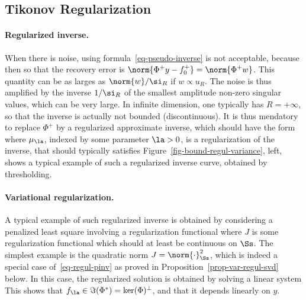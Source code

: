 

\subsection{Tikonov Regularization}

\paragraph{Regularized inverse.}

When there is noise, using formula~\eqref{eq-pseudo-inverse} is not acceptable, because then 
so that the recovery error is $\norm{\Phi^+ y -f_0^+} = \norm{\Phi^+ w}$. This quantity can be as larges as $\norm{w}/\si_R$ if $w \propto u_R$. The noise is thus amplified by the inverse $1/\si_R$ of the smallest amplitude non-zero singular values, which can be very large. In infinite dimension, one typically has $R=+\infty$, so that the inverse is actually not bounded (discontinuous). It is thus mendatory to replace $\Phi^+$ by a regularized approximate inverse, which should have the form 
where $\mu_\la$, indexed by some parameter $\la>0$, is a regularization of the inverse, that should typically satisfies 
Figure~\ref{fig-bound-regul-variance}, left, shows a typical example of such a regularized inverse curve, obtained by thresholding.


\paragraph{Variational regularization.}

A typical example of such regularized inverse is obtained by considering a penalized least square involving a regularization functional
where $J$ is some regularization functional which should at least be continuous on $\Ss$. The simplest example is the quadratic norm $J=\norm{\cdot}_\Ss^2$, 
which is indeed a special case of~\eqref{eq-regul-pinv} as proved in Proposition~\ref{prop-var-regul-svd} below. In this case, the regularized solution is obtained by solving a linear system
This shows that $f_\la \in \Im(\Phi^*) = \ker(\Phi)^\bot$, and that it depends linearly on $y$. 

